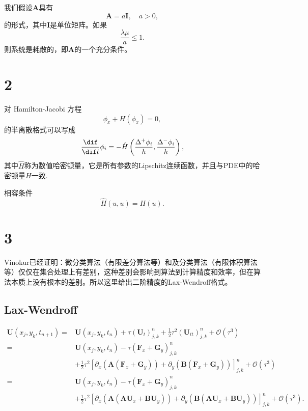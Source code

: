 \documentclass[12pt]{article}
\begin{document}
我们假设$\bm{A}$具有
\begin{equation}
	\bm{A} = a \bm{I},\quad a>0,
\end{equation}
的形式，其中$\bm{I}$是单位矩阵。如果
\begin{equation}
	\frac{\lambda \mu}{a} \leqslant 1 .
\end{equation}
则系统是耗散的，即$\bm{A}$的一个充分条件。


\section{2}

对 Hamilton-Jacobi 方程
\begin{equation}
	\phi_x + H(\phi_x) = 0,
\end{equation}
的半离散格式可以写成
\begin{equation}
	\frac{\dif }{\dif t} \phi_i = - \hat{H}\left(\frac{\Delta^+ \phi_i}{h},\frac{\Delta^- \phi_i}{h}\right),
\end{equation}
其中$\hat{H}$称为数值哈密顿量，它是所有参数的Lipschitz连续函数，并且与PDE中的哈密顿量$H$一致.

相容条件
\begin{equation}
	\hat{H}\left(u,u\right) = H(u).
\end{equation}


\section{3}

Vinokur已经证明：微分类算法（有限差分算法等）和及分类算法（有限体积算法等）仅仅在集合处理上有差别，这种差别会影响到算法到计算精度和效率，但在算法本质上没有根本的差别。所以这里给出二阶精度的Lax-Wendroff格式。\cite[P229]{zhang}

\subsection{Lax-Wendroff}


\begin{align}
\bm{U}\left(x_{j}, y_k, t_{n+1}\right) =&\bm{U}\left(x_{j}, y_k, t_{n}\right)+\tau\left(\bm{U}_{t}\right)_{j,k}^{n}+\frac{1}{2} \tau^{2}\left(\bm{U}_{t t}\right)_{j,k}^{n}+\mathcal{O}\left(\tau^{3}\right) \\
=&\bm{U}\left(x_{j}, y_k, t_{n}\right)-\tau\left(\bm{F}_{x}+\bm{G}_y\right)_{j,k}^{n}\\
& +\frac{1}{2} \tau^{2} \left[\partial_{x}\left(\bm{A}\left(\bm{F}_{x}+\bm{G}_y\right) \right)+\partial_{y}\left(\bm{B}\left(\bm{F}_{x}+\bm{G}_y\right) \right)\right]_{j,k}^{n}+\mathcal{O}\left(\tau^{3}\right) \\
=&\bm{U}\left(x_{j}, y_k, t_{n}\right)-\tau\left(\bm{F}_{x}+\bm{G}_y\right)_{j,k}^{n}\\
&+\frac{1}{2} \tau^{2} \left[\partial_{x}\left(\bm{A}\left(\bm{A}\bm{U}_{x}+\bm{B}\bm{U}_{y}\right) \right)+\partial_{y}\left(\bm{B}\left(\bm{A}\bm{U}_{x}+\bm{B}\bm{U}_{y}\right) \right)\right]_{j,k}^{n}+\mathcal{O}\left(\tau^{3}\right).
\end{align}
\end{document}
